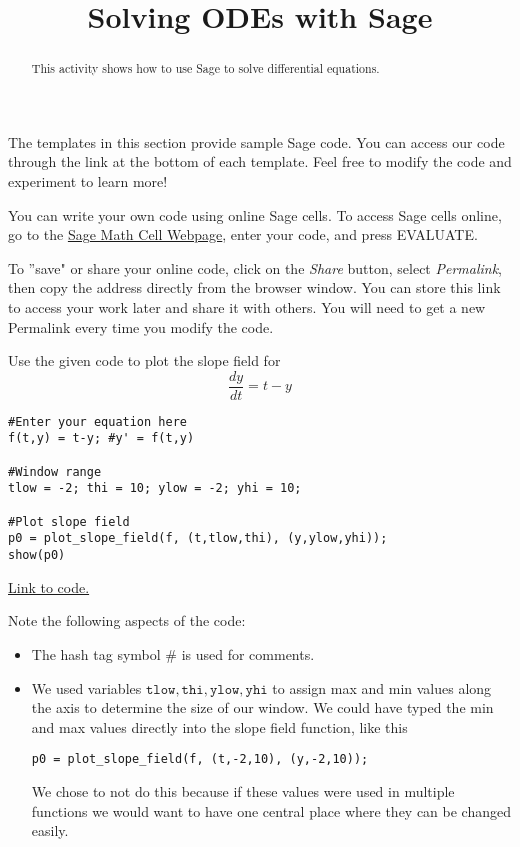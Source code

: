 \documentclass{ximera}
\title{Solving ODEs with Sage}
\begin{document}
\begin{abstract}
This activity shows how to use Sage to solve differential equations.

\end{abstract}

\maketitle

The templates in this section provide sample Sage code. You can access our code through the link at the bottom of each template.  Feel free to modify the code and experiment to learn more! 
 
You can write your own code using online Sage cells.  To access Sage cells online, go to the \href{https://sagecell.sagemath.org/}{Sage Math Cell Webpage}, enter your code, and press EVALUATE. 
 
To ''save" or share your online code, click on the \emph{Share} button, select \emph{Permalink}, then copy the address directly from the browser window.  You can store this link to access your work later and share it with others.  You will need to get a new Permalink every time you modify the code.

\begin{example}\label{ex:SageSlopeField}
    Use the given code to plot the slope field for 
    $$\frac{dy}{dt}=t-y$$

    \begin{verbatim}
#Enter your equation here
f(t,y) = t-y; #y' = f(t,y)

#Window range
tlow = -2; thi = 10; ylow = -2; yhi = 10;

#Plot slope field 
p0 = plot_slope_field(f, (t,tlow,thi), (y,ylow,yhi));
show(p0)
    \end{verbatim}
\href{https://sagecell.sagemath.org/?z=eJxFjTELgzAQhfdA_sMDhxqIYLtKtzq3dOkogokJhCSNEcm_72kp3d597-67qvdZJZSwJqj3OmYbPIxKijNdZ1kErshN6VA97WwyFjspBI37rUc5Ufnd4oyz6mX9FDak0c90nh3lK5pLh2wspXPbofxh-cHj9uECyV2ICtoqN4Gz2FIfiQ8HHw5eawn6uMslaQVNRe5WST4hSLaYsNWxFR_c9EEC&lang=sage&interacts=eJyLjgUAARUAuQ==}{Link to code.}

\begin{observation}
    Note the following aspects of the code:
    \begin{itemize}
        \item The hash tag symbol \# is used for comments.  
        \item We used variables $\mathtt{tlow, thi, ylow, yhi}$ to assign max and min values along the axis to determine the size of our window.  We could have typed the min and max values directly into the slope field function, like this
        \begin{verbatim}p0 = plot_slope_field(f, (t,-2,10), (y,-2,10));\end{verbatim}
        We chose to not do this because if these values were used in multiple functions we would want to have one central place where they can be changed easily.
    \end{itemize}
\end{observation}
\end{example}   
\end{document}
